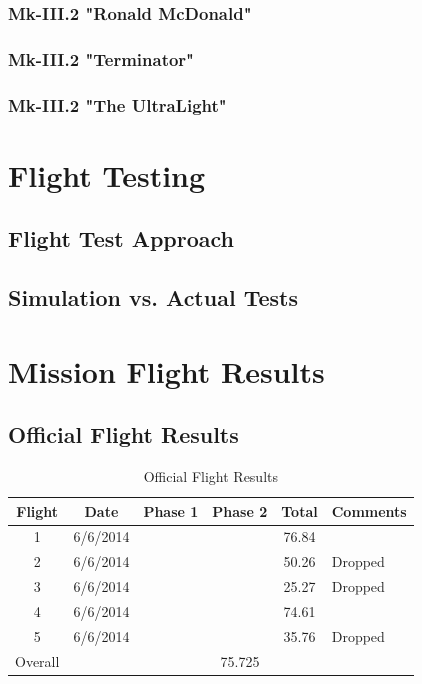 \documentclass[11pt]{article}
\begin{document}
	\subsubsection{Mk-III.2 "Ronald McDonald"}
	\label{mk3.2}
	\subsubsection{Mk-III.2 "Terminator"}
	\label{mk3.3}
	\subsubsection{Mk-III.2 "The UltraLight"}
	\label{mk3.4}

	\section{Flight Testing}
		\label{FlightTesting}
		\subsection{Flight Test Approach}
		\label{FltTstAppr}
		\subsection{Simulation vs. Actual Tests}
		\label{simvsact}

\section{Mission Flight Results}
	\label{MissionFlightResults}
	\subsection{Official Flight Results}
	\label{OffFltRes}
	\begin{table}[!ht]
		\begin{center}
			\begin{tabular}{ | c | c | c | c | c | p{3cm} |}
				\hline
				\textbf{Flight} & \textbf{Date} & \textbf{Phase 1} & \textbf{Phase 2} & \textbf{Total} & \textbf{Comments} \\ \hline
				1 & 6/6/2014 &  &  & 76.84 & \\ \hline
				2 & 6/6/2014 &  &  & 50.26 & Dropped\\ \hline
				3 & 6/6/2014 &  &  & 25.27 & Dropped\\ \hline
				4 & 6/6/2014 &  &  & 74.61 & \\ \hline
				5 & 6/6/2014 &  &  & 35.76 & Dropped\\ \hline
				Overall & \multicolumn{5}{c|}{75.725}\\ \hline   
			\end{tabular}
			\caption{Official Flight Results}
			\label{flighttab}
		\end{center}
	\end{table}
\end{document}
